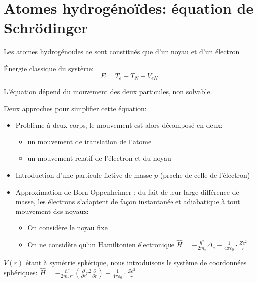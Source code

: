 \documentclass[../main.tex]{subfile}
\begin{document}
\part{Atomes hydrogénoïdes: équation de Schrödinger}

\begin{defi}
	Les atomes hydrogénoïdes ne sont constitués que d'un noyau et d'un électron
\end{defi}

Énergie classique du système:
$$E = T_e + T_N + V_{eN}$$


L'équation dépend du mouvement des deux particules, non solvable.

Deux approches pour simplifier cette équation:
\begin{itemize}
	\item Problème à deux corps, le mouvement est alors décomposé en deux:
\begin{itemize}	
	\item un mouvement de translation de l'atome
	\item un mouvement relatif de l'électron et du noyau
\end{itemize}
	\item Introduction d'une particule fictive de masse $p$ (proche de celle de l'électron)
	\item Approximation de Born-Oppenheimer : du fait de leur large différence de masse, les électrons s'adaptent de façon instantanée et adiabatique à tout mouvement des noyaux:
\begin{itemize}	
	\item On considère le noyau fixe
	\item On ne considère qu'un Hamiltonien électronique
	$\hat{H} = -\frac{\hbar^2}{2m_e} \Delta_e - \frac{1}{4\pi\varepsilon_0}\cdot \frac{Ze^2}{\hat{r}}$
\end{itemize}
\end{itemize}

$V(r)$ étant à symétrie sphérique, nous introduisons le système de coordonnées sphériques:
	$\hat{H} = -\frac{\hbar^2}{2m_er^2} (\frac{\partial}{\partial r} r^2 \frac{\partial}{\partial r}) - \frac{1}{4\pi\varepsilon_0}\cdot \frac{Ze^2}{\hat{r}}$

\end{document}
